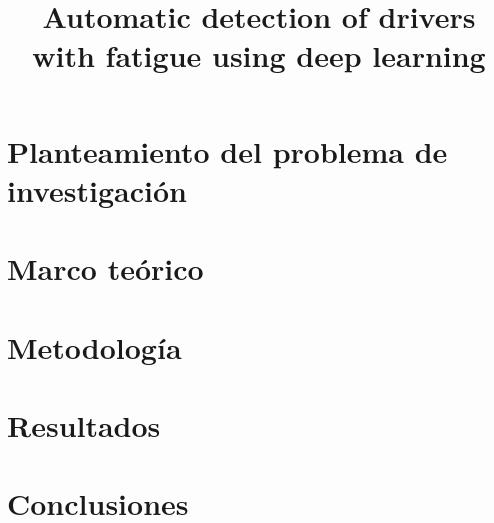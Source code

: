\documentclass[modern,hyperref,histinit,frontispiece]{teipel-thesis-en}
\title{Automatic detection of drivers with fatigue using deep learning}
\begin{document}
\setcounter{secnumdepth}{3}
\setcounter{tocdepth}{3}
\maketitle
	
	
    
\renewcommand{\contentsname}{Contenido}
  \tableofcontents 
\renewcommand{\listfigurename}{Lista de Figuras}
	\listoffigures
\renewcommand{\listtablename}{Lista de Tablas}
	\listoftables	
\beginmainmatter

	
\renewcommand{\partname}{Capitulo}

	\part{Planteamiento del problema de investigación}
	
    \part{Marco teórico}
	
    \part{Metodología} 
	
    \part{Resultados} 
	
     \part{Conclusiones} 
	
    \renewcommand{\bibname}{Bibliografía}
    
\end{document}

